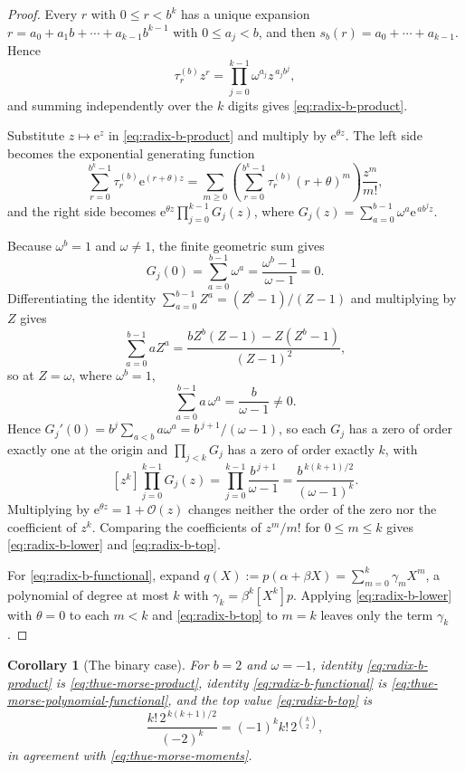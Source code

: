 \documentclass[11pt,oneside,openany]{book}
\newtheorem{corollary}[corollary]{Corollary}
\theoremstyle{definition}
\theoremstyle{remark}
\newcommand{\OO}{\mathcal O}
\newcommand{\e}{\mathrm e}
\newcommand{\defeq}{\mathrel{:=}}
\begin{document}
\begin{proof}
Every $r$ with $0\le r<b^k$ has a unique expansion $r=a_0+a_1b+\cdots+a_{k-1}b^{k-1}$ with $0\le a_j<b$, and then $s_b(r)=a_0+\cdots+a_{k-1}$.  Hence
\[
 \tau^{(b)}_rz^r=\prod_{j=0}^{k-1}\omega^{a_j}z^{\,a_jb^j},
\]
and summing independently over the $k$ digits gives \eqref{eq:radix-b-product}.

Substitute $z\mapsto\e^{z}$ in \eqref{eq:radix-b-product} and multiply by $\e^{\theta z}$.  The left side becomes the exponential generating function
\[
 \sum_{r=0}^{b^k-1}\tau^{(b)}_r\e^{(r+\theta)z}
 =\sum_{m\ge0}
   \left(\sum_{r=0}^{b^k-1}\tau^{(b)}_r(r+\theta)^m\right)\frac{z^m}{m!},
\]
and the right side becomes $\e^{\theta z}\prod_{j=0}^{k-1}G_j(z)$, where
$G_j(z)=\sum_{a=0}^{b-1}\omega^a\e^{\,ab^jz}$.

Because $\omega^b=1$ and $\omega\ne1$, the finite geometric sum gives
\[
 G_j(0)=\sum_{a=0}^{b-1}\omega^a=\frac{\omega^b-1}{\omega-1}=0 .
\]
Differentiating the identity $\sum_{a=0}^{b-1}Z^a=(Z^b-1)/(Z-1)$ and multiplying by $Z$ gives
\[
 \sum_{a=0}^{b-1}aZ^a
 =\frac{bZ^b(Z-1)-Z(Z^b-1)}{(Z-1)^2},
\]
so at $Z=\omega$, where $\omega^b=1$,
\begin{equation}\label{eq:omega-first-moment}
 \sum_{a=0}^{b-1}a\,\omega^a=\frac{b}{\omega-1}\ne0 .
\end{equation}
Hence $G_j'(0)=b^j\sum_{a<b}a\omega^a=b^{\,j+1}/(\omega-1)$, so each $G_j$ has a zero of order exactly one at the origin and $\prod_{j<k}G_j$ has a zero of order exactly $k$, with
\[
 [z^k]\prod_{j=0}^{k-1}G_j(z)
 =\prod_{j=0}^{k-1}\frac{b^{\,j+1}}{\omega-1}
 =\frac{b^{\,k(k+1)/2}}{(\omega-1)^k}.
\]
Multiplying by $\e^{\theta z}=1+\OO(z)$ changes neither the order of the zero nor the coefficient of $z^k$.  Comparing the coefficients of $z^m/m!$ for $0\le m\le k$ gives \eqref{eq:radix-b-lower} and \eqref{eq:radix-b-top}.

For \eqref{eq:radix-b-functional}, expand $q(X)\defeq p(\alpha+\beta X)=\sum_{m=0}^{k}\gamma_mX^m$, a polynomial of degree at most $k$ with $\gamma_k=\beta^k[X^k]p$.  Applying \eqref{eq:radix-b-lower} with $\theta=0$ to each $m<k$ and \eqref{eq:radix-b-top} to $m=k$ leaves only the term $\gamma_k$.
\end{proof}

\begin{corollary}[The binary case]\label{cor:radix-two-recovers-thue-morse}
For $b=2$ and $\omega=-1$, identity \eqref{eq:radix-b-product} is \eqref{eq:thue-morse-product}, identity \eqref{eq:radix-b-functional} is \eqref{eq:thue-morse-polynomial-functional}, and the top value \eqref{eq:radix-b-top} is
\[
 \frac{k!\,2^{\,k(k+1)/2}}{(-2)^k}
 =(-1)^kk!\,2^{\binom k2},
\]
in agreement with \eqref{eq:thue-morse-moments}.
\end{corollary}
\end{document}
